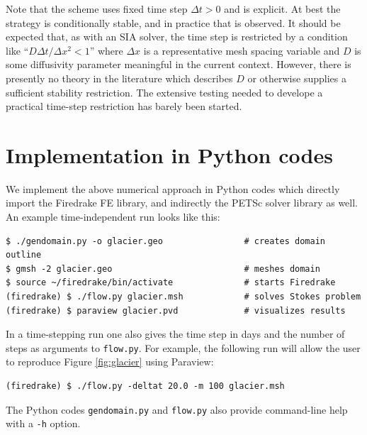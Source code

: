 \documentclass[letterpaper,final,12pt,reqno]{amsart}
\begin{document}
Note that the scheme uses fixed time step $\Delta t > 0$ and is explicit.  At best the strategy is conditionally stable, and in practice that is observed.  It should be expected that, as with an SIA solver, the time step is restricted by a condition like ``$D\Delta t / \Delta x^2 < 1$'' where $\Delta x$ is a representative mesh spacing variable and $D$ is some diffusivity parameter meaningful in the current context.  However, there is presently no theory in the literature which describes $D$ or otherwise supplies a sufficient stability restriction.  The extensive testing needed to develope a practical time-step restriction has barely been started.


\section{Implementation in Python codes} \label{sec:implementation}

We implement the above numerical approach in Python codes which directly import the Firedrake FE library, and indirectly the PETSc solver library as well.  An example time-independent run looks like this:

\medskip
\begin{Verbatim}
$ ./gendomain.py -o glacier.geo                # creates domain outline
$ gmsh -2 glacier.geo                          # meshes domain
$ source ~/firedrake/bin/activate              # starts Firedrake
(firedrake) $ ./flow.py glacier.msh            # solves Stokes problem
(firedrake) $ paraview glacier.pvd             # visualizes results
\end{Verbatim}

\medskip
In a time-stepping run one also gives the time step in days and the number of steps as arguments to \texttt{flow.py}.  For example, the following run will allow the user to reproduce Figure \ref{fig:glacier} using Paraview:

\medskip
\begin{Verbatim}
(firedrake) $ ./flow.py -deltat 20.0 -m 100 glacier.msh
\end{Verbatim}

\medskip
\noindent The Python codes \texttt{gendomain.py} and \texttt{flow.py} also provide command-line help with a \texttt{-h} option.
\end{document}
